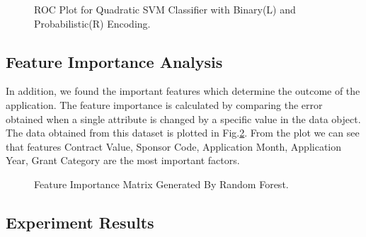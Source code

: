 \documentclass{article} %
\begin{document}
\begin{figure}[h]
\begin{center}
		\end{center}
		
		\caption{ROC Plot for Quadratic SVM Classifier with Binary(L) and Probabilistic(R) Encoding.}
		\label{fig:ROCProbBin}
	\end{figure}
	
	\subsection{Feature Importance Analysis}
	In addition, we found the important features which determine the outcome of the application. The feature importance is calculated by comparing the error obtained when a single attribute is changed by a specific value in the data object. The data obtained from this dataset is plotted in Fig.\ref{fig:FIM}. From the plot we can see that features Contract Value, Sponsor Code, Application Month, Application Year, Grant Category are the most important factors.
	
	\begin{figure}[h]
		\begin{center}
		\end{center}
		\caption{Feature Importance Matrix Generated By Random Forest.}
		\label{fig:FIM}
	\end{figure} 
	
	\subsection{Experiment Results}
	
\end{document}
